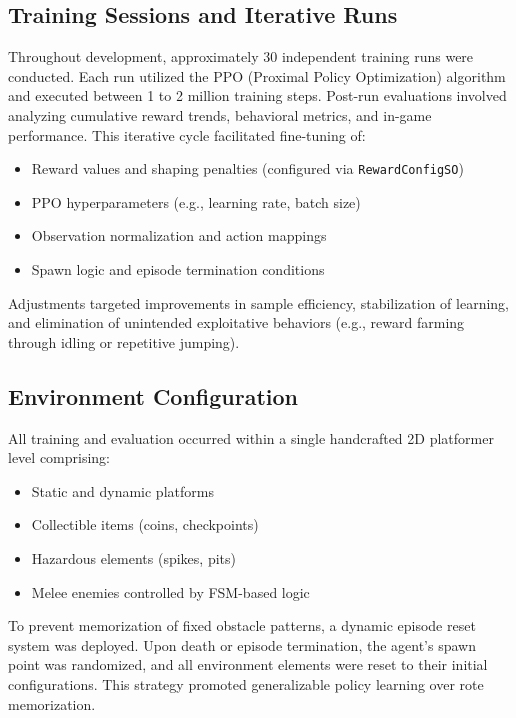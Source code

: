 \documentclass[12pt,oneside,openright,a4paper]{cpe-english-project}
\begin{document}
\subsection{Training Sessions and Iterative Runs}

Throughout development, approximately 30 independent training runs were conducted. Each run utilized the PPO (Proximal Policy Optimization) algorithm and executed between 1 to 2 million training steps. Post-run evaluations involved analyzing cumulative reward trends, behavioral metrics, and in-game performance. This iterative cycle facilitated fine-tuning of:

\begin{itemize}
\item Reward values and shaping penalties (configured via \texttt{RewardConfigSO})
\item PPO hyperparameters (e.g., learning rate, batch size)
\item Observation normalization and action mappings
\item Spawn logic and episode termination conditions
\end{itemize}

Adjustments targeted improvements in sample efficiency, stabilization of learning, and elimination of unintended exploitative behaviors (e.g., reward farming through idling or repetitive jumping).

\subsection{Environment Configuration}

All training and evaluation occurred within a single handcrafted 2D platformer level comprising:

\begin{itemize}
\item Static and dynamic platforms
\item Collectible items (coins, checkpoints)
\item Hazardous elements (spikes, pits)
\item Melee enemies controlled by FSM-based logic
\end{itemize}

To prevent memorization of fixed obstacle patterns, a dynamic episode reset system was deployed. Upon death or episode termination, the agent's spawn point was randomized, and all environment elements were reset to their initial configurations. This strategy promoted generalizable policy learning over rote memorization.
\end{document}
